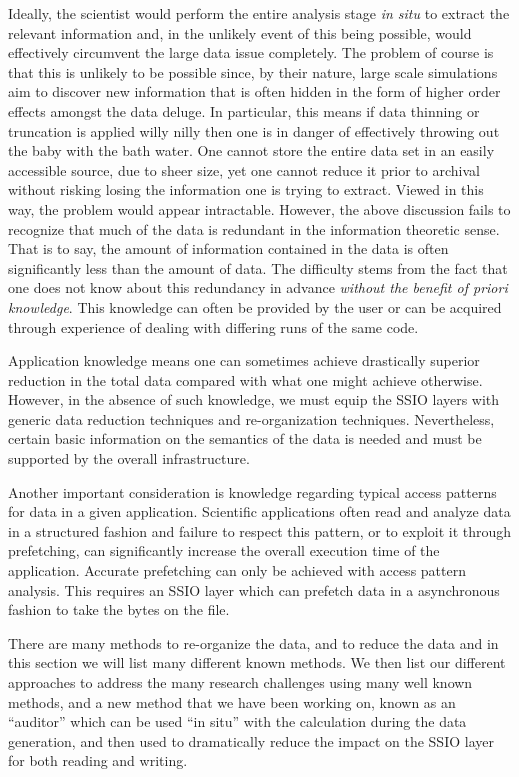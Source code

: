Ideally, the scientist would perform the entire analysis stage {\em in situ} to
extract the relevant information and, in the unlikely event of this being
possible, would effectively circumvent the large data issue completely.  The
problem of course is that this is unlikely to be possible since, by their
nature, large scale simulations aim to discover new information that is often
hidden in the form of higher order effects amongst the data deluge. In
particular, this means if data thinning or truncation is applied willy nilly
then one is in danger of effectively throwing out the baby with the bath water.
One cannot store the entire data set in an easily accessible source, due to
sheer size, yet one cannot reduce it prior to archival without risking losing
the information one is trying to extract.  Viewed in this way, the problem
would appear intractable. However, the above discussion fails to recognize that
much of the data is redundant in the information theoretic sense.  That is to
say, the amount of information contained in the data is often significantly
less than the amount of data.  The difficulty stems from the fact that one does
not know about this redundancy in advance \emph{without the benefit of 
priori knowledge}. This knowledge can often be provided by the user or can 
be acquired through experience of dealing with differing runs of the same
code. 

Application knowledge means one can sometimes achieve drastically superior
reduction in the total data compared with what one might achieve otherwise.
However, in the absence of such knowledge, we must equip the SSIO layers with
generic data reduction techniques and re-organization techniques.
Nevertheless, certain basic information on the semantics of the data is needed 
and must be supported by the overall infrastructure. 

Another important consideration is knowledge regarding typical access patterns
for data in a given application. Scientific applications often read and analyze
data in a structured fashion and failure to respect this pattern, or to exploit
it through prefetching, can significantly increase the overall execution time
of the application. Accurate prefetching can only be achieved with access
pattern analysis. This requires an SSIO layer which can prefetch data in a
asynchronous fashion to take the bytes on the file.

There are many methods to re-organize the data, and to reduce the data and in
this section we will list many different known methods.  We then list our
different approaches to address the many research challenges using many well
known methods, and a new method that we have been working on, known as an
``auditor'' which can be used ``in situ'' with the calculation during the data
generation, and then used to dramatically reduce the impact on the SSIO layer
for both reading and writing.


